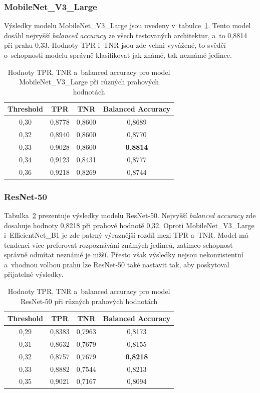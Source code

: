 \subsubsection*{MobileNet\_V3\_Large}
Výsledky modelu MobileNet\_V3\_Large jsou uvedeny v~tabulce~\ref{mobilenetMetrics}. Tento model dosáhl nejvyšší \textit{balanced accuracy} ze všech testovaných architektur, a~to 0,8814 při prahu 0,33. Hodnoty TPR i~TNR jsou zde velmi vyvážené, to svědčí o~schopnosti modelu správně klasifikovat jak známé, tak neznámé jedince.


\begin{table}[h!]
	\centering
	\begin{tabular}{|c|c|c|c|}
		\hline
		\textbf{Threshold} & \textbf{TPR} & \textbf{TNR} & \textbf{Balanced Accuracy} \\ \hline
		0,30 & 0,8778 & 0,8600 & 0,8689 \\ \hline
		0,32 & 0,8940 & 0,8600 & 0,8770 \\ \hline
		0,33 & 0,9028 & 0,8600 & \textbf{0,8814} \\ \hline
		0,34 & 0,9123 & 0,8431 & 0,8777 \\ \hline
		0,36 & 0,9218 & 0,8269 & 0,8744 \\ \hline
	\end{tabular}
	\caption{Hodnoty TPR, TNR a~balanced accuracy pro model MobileNet\_V3\_Large při různých prahových hodnotách}
	\label{mobilenetMetrics}
\end{table}

\subsubsection*{ResNet-50}
Tabulka~\ref{resnetMetrics} prezentuje výsledky modelu ResNet-50. Nejvyšší \textit{balanced accuracy} zde dosahuje hodnoty 0,8218 při prahové hodnotě 0,32. Oproti MobileNet\_V3\_Large i~EfficientNet\_B1 je zde patrný výraznější rozdíl mezi TPR a~TNR. Model má tendenci více preferovat rozpoznávání známých jedinců, zatímco schopnost správně odmítat neznámé je nižší. Přesto však výsledky nejsou nekonzistentní a~vhodnou volbou prahu lze ResNet-50 také nastavit tak, aby poskytoval přijatelné výsledky. 

\begin{table}[h!]
	\centering
	\begin{tabular}{|c|c|c|c|}
		\hline
		\textbf{Threshold} & \textbf{TPR} & \textbf{TNR} & \textbf{Balanced Accuracy} \\ \hline
		0,29 & 0,8383 & 0,7963 & 0,8173 \\ \hline
		0,31 & 0,8632 & 0,7679 & 0,8155 \\ \hline
		0,32 & 0,8757 & 0,7679 & \textbf{0,8218} \\ \hline
		0,33 & 0,8882 & 0,7544 & 0,8213 \\ \hline
		0,35 & 0,9021 & 0,7167 & 0,8094 \\ \hline
	\end{tabular}
	\caption{Hodnoty TPR, TNR a~balanced accuracy pro model ResNet-50 při různých prahových hodnotách}
	\label{resnetMetrics}
\end{table}

